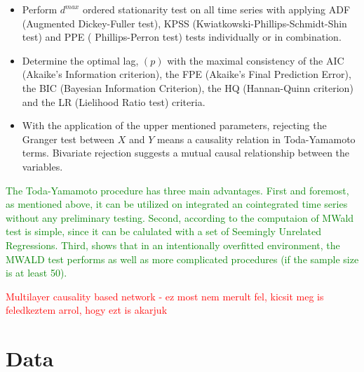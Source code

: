 \documentclass[12pt,bibliography=totoc]{article}
\begin{document}
\begin{itemize}
\item Perform $d^{max}$  ordered stationarity test on all time series with applying ADF (Augmented Dickey-Fuller test), KPSS (Kwiatkowski-Phillips-Schmidt-Shin test) and PPE ( Phillips-Perron test) tests individually or in combination. 

\item Determine the optimal lag, $(p)$ with the maximal consistency of the AIC (Akaike's Information criterion), the FPE (Akaike's Final Prediction Error), the BIC (Bayesian Information Criterion), the HQ (Hannan-Quinn criterion) and the LR (Lielihood Ratio test) criteria.

\item With the application of the upper mentioned parameters, rejecting the Granger test between $X$ and $Y$ means a causality relation in Toda-Yamamoto terms. Bivariate rejection suggests a mutual causal relationship between the variables.
\end{itemize}

\textcolor{green}{The Toda-Yamamoto procedure  has  three main advantages.  First and foremost, as mentioned above, it can be utilized on integrated an cointegrated time series without any preliminary testing. Second, according to \cite{rambaldi1996testing} the computaion of MWald test is simple, since it can be calulated with a set of Seemingly  Unrelated  Regressions. Third, \cite{zapata1997monte} shows that in an intentionally overfitted environment, the MWALD test performs as well as more complicated procedures (if the sample size is at least 50).}


\textcolor{red}{Multilayer causality based network - ez most nem merult fel, kicsit meg is feledkeztem arrol, hogy ezt is akarjuk}


\newpage 



\section{Data}
\end{document}
